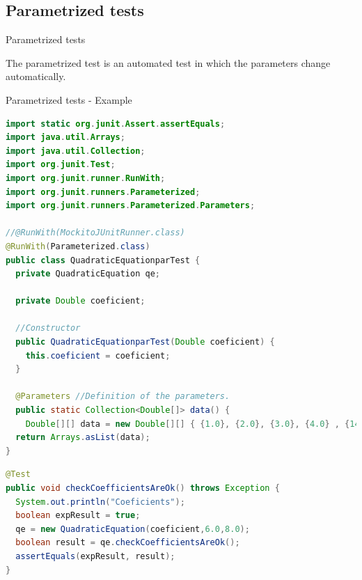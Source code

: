\documentclass[11pt, xcolor=svgnames]{beamer}
\begin{document}
\subsection{Parametrized tests}


\begin{frame}{Parametrized tests}

The parametrized test is an automated test in which the parameters change automatically.

\end{frame}


\begin{frame}[fragile]{Parametrized tests - Example}

\begin{lstlisting}[language=Java,basicstyle=\tiny]
import static org.junit.Assert.assertEquals;
import java.util.Arrays;
import java.util.Collection;
import org.junit.Test;
import org.junit.runner.RunWith;
import org.junit.runners.Parameterized;
import org.junit.runners.Parameterized.Parameters;

//@RunWith(MockitoJUnitRunner.class)
@RunWith(Parameterized.class)
public class QuadraticEquationparTest {
  private QuadraticEquation qe;

  private Double coeficient;

  //Constructor
  public QuadraticEquationparTest(Double coeficient) {
    this.coeficient = coeficient;
  }

  @Parameters //Definition of the parameters.
  public static Collection<Double[]> data() {
    Double[][] data = new Double[][] { {1.0}, {2.0}, {3.0}, {4.0} , {14.0} };
  return Arrays.asList(data);
}
\end{lstlisting}
\end{frame}



\begin{frame}[fragile]
\begin{lstlisting}[language=Java,basicstyle=\tiny]
@Test
public void checkCoefficientsAreOk() throws Exception {
  System.out.println("Coeficients");
  boolean expResult = true;
  qe = new QuadraticEquation(coeficient,6.0,8.0);
  boolean result = qe.checkCoefficientsAreOk();
  assertEquals(expResult, result);
}
\end{lstlisting}
\end{frame}
\end{document}
